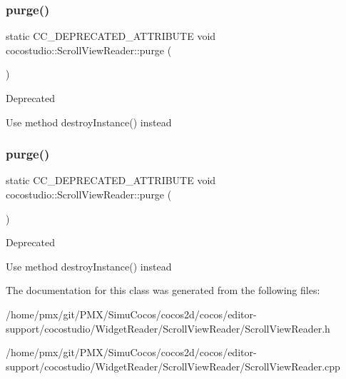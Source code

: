 \subsubsection{\texorpdfstring{purge()}{purge()}\hspace{0.1cm}{\footnotesize\ttfamily [1/2]}}
{\footnotesize\ttfamily static C\+C\+\_\+\+D\+E\+P\+R\+E\+C\+A\+T\+E\+D\+\_\+\+A\+T\+T\+R\+I\+B\+U\+TE void cocostudio\+::\+Scroll\+View\+Reader\+::purge (\begin{DoxyParamCaption}{ }\end{DoxyParamCaption})\hspace{0.3cm}{\ttfamily [static]}}

\begin{DoxyRefDesc}{Deprecated}
\item[\hyperlink{deprecated__deprecated000100}{Deprecated}]Use method destroy\+Instance() instead \end{DoxyRefDesc}
\mbox{\label{classcocostudio_1_1ScrollViewReader_a2b1bf8db98e23b9efe1ad3b0f9e68334}} 
\subsubsection{\texorpdfstring{purge()}{purge()}\hspace{0.1cm}{\footnotesize\ttfamily [2/2]}}
{\footnotesize\ttfamily static C\+C\+\_\+\+D\+E\+P\+R\+E\+C\+A\+T\+E\+D\+\_\+\+A\+T\+T\+R\+I\+B\+U\+TE void cocostudio\+::\+Scroll\+View\+Reader\+::purge (\begin{DoxyParamCaption}{ }\end{DoxyParamCaption})\hspace{0.3cm}{\ttfamily [static]}}

\begin{DoxyRefDesc}{Deprecated}
\item[\hyperlink{deprecated__deprecated000335}{Deprecated}]Use method destroy\+Instance() instead \end{DoxyRefDesc}


The documentation for this class was generated from the following files\+:\begin{DoxyCompactItemize}
\item 
/home/pmx/git/\+P\+M\+X/\+Simu\+Cocos/cocos2d/cocos/editor-\/support/cocostudio/\+Widget\+Reader/\+Scroll\+View\+Reader/Scroll\+View\+Reader.\+h\item 
/home/pmx/git/\+P\+M\+X/\+Simu\+Cocos/cocos2d/cocos/editor-\/support/cocostudio/\+Widget\+Reader/\+Scroll\+View\+Reader/Scroll\+View\+Reader.\+cpp\end{DoxyCompactItemize}
